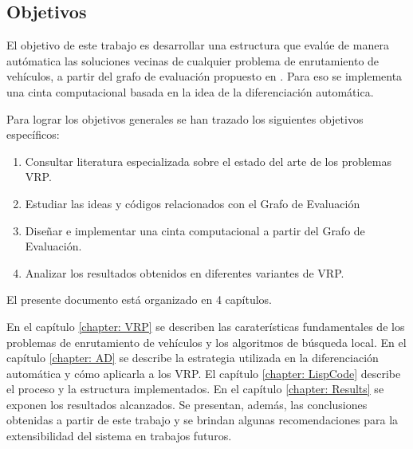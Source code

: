 \subsection*{Objetivos}
El objetivo de este trabajo es desarrollar una estructura que evalúe de manera autómatica las soluciones vecinas de cualquier problema de enrutamiento de vehículos, a partir del grafo de evaluación propuesto en \cite{JJ}. Para eso se implementa una cinta computacional basada en la idea de la diferenciación automática.

Para lograr los objetivos generales se han trazado los siguientes objetivos específicos:

\begin{enumerate}
	\item Consultar literatura especializada sobre el estado del arte de los problemas VRP.
	\item Estudiar las ideas y códigos relacionados con el Grafo de Evaluación \cite{JJ}
	\item Diseñar e implementar una cinta computacional a partir del Grafo de Evaluación.	
	\item Analizar los resultados obtenidos en diferentes variantes de VRP.
\end{enumerate}

El presente documento está organizado en 4 capítulos.

En el capítulo \ref{chapter: VRP} se describen las caraterísticas fundamentales de los problemas de enrutamiento de vehículos y los algoritmos de búsqueda local. En el capítulo \ref{chapter: AD} se describe la estrategia utilizada en la diferenciación automática y cómo aplicarla a los VRP. El capítulo \ref{chapter: LispCode} describe el proceso y la estructura implementados. En el capítulo \ref{chapter: Results} se exponen los resultados alcanzados. Se presentan, además, las conclusiones obtenidas a partir de este trabajo y se brindan algunas recomendaciones para la extensibilidad del sistema en trabajos futuros.






